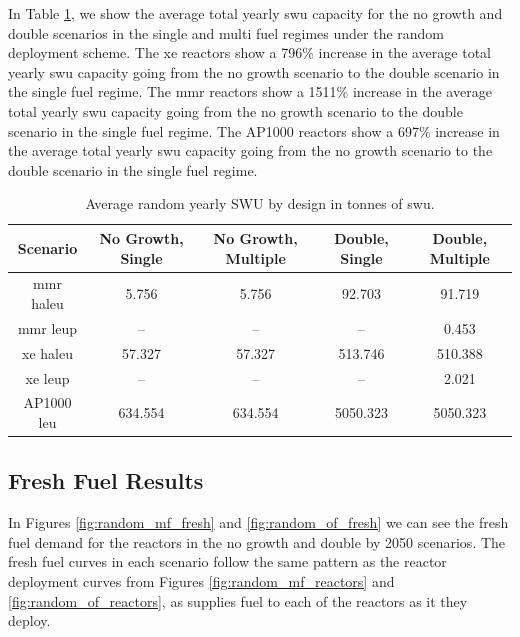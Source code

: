 In Table \ref{tab:random_swu_avg}, we show the average total yearly \gls{swu} capacity for the no growth and double scenarios in the single and multi fuel regimes under the random deployment scheme. The \gls{xe} reactors show a 796\% increase in the average total yearly \gls{swu} capacity going from the no growth scenario to the double scenario in the single fuel regime. The \gls{mmr} reactors show a 1511\% increase in the average total yearly \gls{swu} capacity going from the no growth scenario to the double scenario in the single fuel regime. The AP1000 reactors show a 697\% increase in the average total yearly \gls{swu} capacity going from the no growth scenario to the double scenario in the single fuel regime.

\begin{table}[H]
    \centering
    \caption{Average random yearly SWU by design in tonnes of \gls{swu}.}
    \label{tab:random_swu_avg}
    \begin{tabular}{c c c c c}
       \hline
       Scenario & No Growth, Single & No Growth, Multiple & Double, Single & Double, Multiple  \\
       \hline
       \gls{mmr} \gls{haleu}   & 5.756   & 5.756   & 92.703    & 91.719   \\
       \gls{mmr} \gls{leup}    & --      & --      & --       & 0.453    \\
       \gls{xe} \gls{haleu}    & 57.327  & 57.327  & 513.746  & 510.388  \\
       \gls{xe} \gls{leup}     & --      & --      & --       & 2.021    \\
       AP1000 \gls{leu}        & 634.554 & 634.554 & 5050.323 & 5050.323 \\
       \hline
    \end{tabular}
\end{table}





\subsection{Fresh Fuel Results}
\label{sec:random_fresh}

In Figures \ref{fig:random_mf_fresh} and \ref{fig:random_of_fresh} we can see the fresh fuel demand for the reactors in the no growth and double by 2050 scenarios. The fresh fuel curves in each scenario follow the same pattern as the reactor deployment curves from Figures \ref{fig:random_mf_reactors} and \ref{fig:random_of_reactors}, as \cyclus supplies fuel to each of the reactors as it they deploy.

